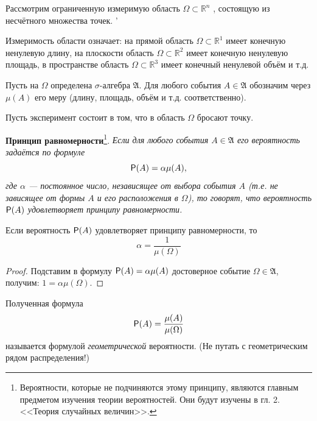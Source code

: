 Рассмотрим ограниченную измеримую область $\Omega \subset \mathbb{R}^n$ , состоящую из несчётного множества точек. '

Измеримость области означает: на прямой область $\Omega \subset \mathbb{R}^1$ имеет конечную ненулевую длину, на плоскости область $\Omega \subset \mathbb{R}^2$ имеет конечную ненулевую площадь, в пространстве область $\Omega \subset \mathbb{R}^3$ имеет конечный ненулевой объём и т.д. 

Пусть на $\Omega$ определена $\sigma$-алгебра $\mathfrak{A}$. Для любого события $A \in \mathfrak{A}$ обозначим через $\mu(A)$ его меру (длину, площадь, объём и т.д. соответственно). 

Пусть эксперимент состоит в том, что в область $\Omega$ бросают точку.

\textbf{Принцип равномерности}\footnote{
Вероятности, которые не подчиняются этому принципу, являются главным предметом изучения теории вероятностей. Они будут изучены в гл. 2. <<Теория случайных величин>>.	
}. 
\textit{Если для любого события $A \in \mathfrak{A}$ его вероятность задаётся по формуле
$$\P(A) = \alpha \mu(A),$$
где $\alpha$ — постоянное число, независящее от выбора события $A$ (т.е. не зависящее от формы $A$ и его расположения в $\Omega$), то говорят, что вероятность $\P(A)$ удовлетворяет принципу равномерности.}

\begin{lemma}
	\label{lemma:4.19}
Если вероятность $\P(A)$ удовлетворяет принципу равномерности, то
$$\alpha=\frac{1}{\mu(\Omega)}$$
\end{lemma}

\begin{proof}
	Подставим в формулу $\P(A) = \alpha \mu(A)$ достоверное событие $\Omega \in \mathfrak{A}$, получим: $1 = \alpha\mu(\Omega).$
\end{proof} 

\begin{definition}
	\label{def:4.20}
Полученная формула
$$\P(A) = \frac{\mu(A)}{\mu(\Omega)}$$
называется формулой \textit{геометрической} вероятности. (Не путать с геометрическим рядом распределения!)
\end{definition}

